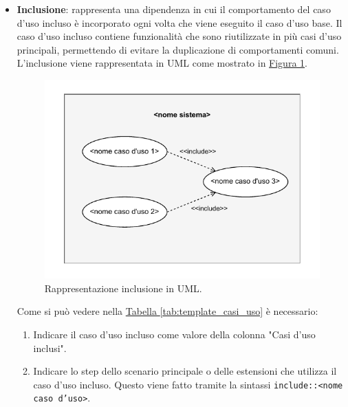 \begin{itemize}
\begin{itemize}
        \item \textbf{Inclusione}: rappresenta una dipendenza in cui il comportamento del caso d'uso incluso è incorporato ogni volta che viene eseguito il caso d'uso base. Il caso d'uso incluso contiene funzionalità che sono riutilizzate in più casi d'uso principali, permettendo di evitare la duplicazione di comportamenti comuni.
        L'inclusione viene rappresentata in UML come mostrato in \hyperref[fig:inclusione_uml]{Figura \ref{fig:inclusione_uml}}.
        \begin{figure}[H]
            \centering
            \includegraphics{Sezioni/ProcessiPrimari/Immagini/inclusione_uml.pdf}
            \caption{Rappresentazione inclusione in UML.}
            \label{fig:inclusione_uml}
        \end{figure}
        Come si può vedere nella \hyperref[tab:template_casi_uso]{Tabella \ref{tab:template_casi_uso}} è necessario:
        \begin{enumerate}
            \item Indicare il caso d'uso incluso come valore della colonna "Casi d'uso inclusi".
            \item Indicare lo step dello scenario principale o delle estensioni che utilizza il caso d'uso incluso.
            Questo viene fatto tramite la sintassi \texttt{include::<nome caso d'uso>}.
        \end{enumerate} 


\end{itemize}
\end{itemize}
